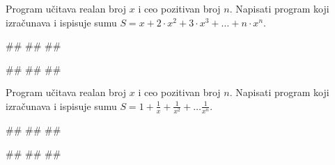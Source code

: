 \begin{Exercise}[label=p1.3_10]
 Program učitava realan broj $x$ i ceo pozitivan broj $n$. Napisati
 program koji izračunava i ispisuje sumu $S=x+2\cdot x^2+3\cdot
 x^3+\ldots+n\cdot x^n$.
 
\begin{miditest}
\begin{upotreba}{1}
#\naslovInt#
##
##
\end{upotreba}
\end{miditest}
\begin{miditest}
\begin{upotreba}{2}
#\naslovInt#
##
##
\end{upotreba}
\end{miditest}
\end{Exercise}
\begin{Answer}[ref=p1.3_10]
\end{Answer}


\begin{Exercise}[label=p1.3_11]
 Program učitava realan broj $x$ i ceo pozitivan broj $n$. Napisati
 program koji izračunava i ispisuje sumu
 $S=1+\frac{1}{x}+\frac{1}{x^2}+\ldots\frac{1}{x^n}$.
 
\begin{miditest}
\begin{upotreba}{1}
#\naslovInt#
##
##
\end{upotreba}
\end{miditest}
\begin{miditest}
\begin{upotreba}{2}
#\naslovInt#
##
##
\end{upotreba}
\end{miditest}
\end{Exercise}
\begin{Answer}[ref=p1.3_11]
\end{Answer}


